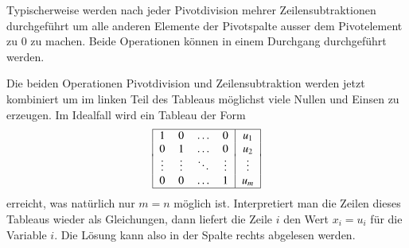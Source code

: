 Typischerweise werden nach jeder Pivotdivision mehrer Zeilensubtraktionen
durchgeführt um alle anderen Elemente der Pivotspalte ausser dem
Pivotelement zu $0$ zu machen.
Beide Operationen können in einem Durchgang durchgeführt werden.

Die beiden Operationen Pivotdivision und Zeilensubtraktion werden jetzt
kombiniert um im linken Teil des Tableaus möglichst viele Nullen und
Einsen zu erzeugen.
Im Idealfall wird ein Tableau der Form
\[
\begin{tabular}{|>{$}c<{$}>{$}c<{$}>{$}c<{$}>{$}c<{$}|>{$}c<{$}|}
\hline
     1&     0&\dots &     0&u_1   \\
     0&     1&\dots &     0&u_2   \\[-2pt]
\vdots&\vdots&\ddots&\vdots&\vdots\\
     0&     0&\dots &     1&u_m   \\
\hline
\end{tabular}
\]
erreicht, was natürlich nur $m=n$ möglich ist.
Interpretiert man die Zeilen dieses Tableaus wieder als Gleichungen,
dann liefert die Zeile $i$ den Wert $x_i=u_i$ für die Variable $i$.
Die Lösung kann also in der Spalte rechts abgelesen werden.

